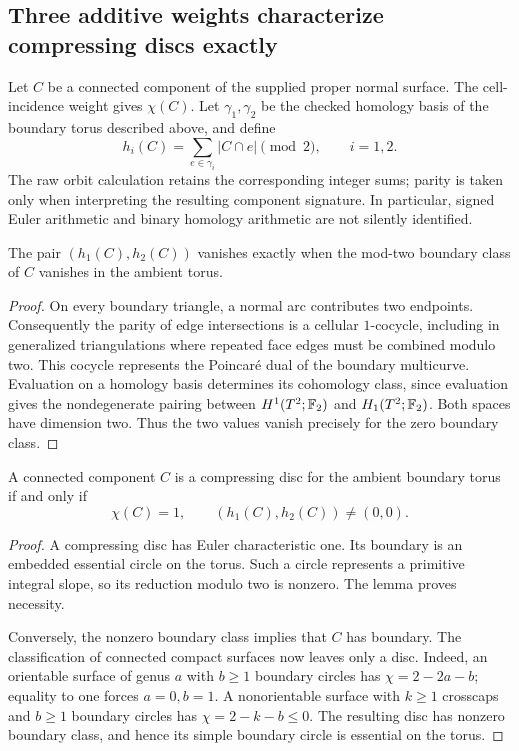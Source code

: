 \subsection{Three additive weights characterize compressing discs exactly}
\label{sec:three-weight-criterion}

Let $C$ be a connected component of the supplied proper normal surface.
The cell-incidence weight gives $\chi(C)$. Let $\gamma_1,\gamma_2$ be the
checked homology basis of the boundary torus described above, and define
\[
 h_i(C)=\sum_{e\in\gamma_i}|C\cap e|\pmod2,
 \qquad i=1,2.
\]
The raw orbit calculation retains the corresponding integer sums; parity is
taken only when interpreting the resulting component signature. In
particular, signed Euler arithmetic and binary homology arithmetic are not
silently identified.

\begin{lemma}
\label{lem:boundary-character-completeness}
The pair $(h_1(C),h_2(C))$ vanishes exactly when the mod-two boundary class of
$C$ vanishes in the ambient torus.
\end{lemma}
\begin{proof}
On every boundary triangle, a normal arc contributes two endpoints.
Consequently the parity of edge intersections is a cellular $1$-cocycle,
including in generalized triangulations where repeated face edges must be
combined modulo two. This cocycle represents the Poincar\'e dual of the
boundary multicurve. Evaluation on a homology basis determines its cohomology
class, since evaluation gives the nondegenerate pairing between
$H^1(T^2;\mathbb F_2)$ and $H_1(T^2;\mathbb F_2)$. Both spaces have dimension two. Thus
the two values vanish precisely for the zero boundary class.
\end{proof}

\begin{theorem}
\label{thm:three-weight-disc}
A connected component $C$ is a compressing disc for the ambient boundary
torus if and only if
\[
 \chi(C)=1,
 \qquad (h_1(C),h_2(C))\ne(0,0).
\]
\end{theorem}
\begin{proof}
A compressing disc has Euler characteristic one. Its boundary is an embedded
essential circle on the torus. Such a circle represents a primitive integral
slope, so its reduction modulo two is nonzero. The lemma proves necessity.

Conversely, the nonzero boundary class implies that $C$ has boundary. The
classification of connected compact surfaces now leaves only a disc. Indeed,
an orientable surface of genus $a$ with $b\ge1$ boundary circles has
$\chi=2-2a-b$; equality to one forces $a=0,b=1$. A nonorientable surface with
$k\ge1$ crosscaps and $b\ge1$ boundary circles has
$\chi=2-k-b\le0$. The resulting disc has nonzero boundary class, and hence
its simple boundary circle is essential on the torus.
\end{proof}

